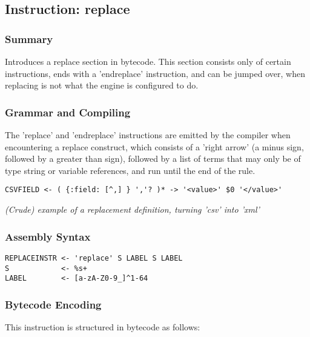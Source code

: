 \subsection{Instruction: replace}

\subsubsection{Summary}

Introduces a replace section in bytecode. This section consists only
of certain instructions, ends with a 'endreplace' instruction, and
can be jumped over, when replacing is not what the engine is configured
to do.

\subsubsection{Grammar and Compiling}

The 'replace' and 'endreplace' instructions are emitted by the compiler
when encountering a replace construct, which consists of a 'right arrow'
(a minus sign, followed by a greater than sign), followed by a list of
terms that may only be of type string or variable references, and run
until the end of the rule.

\begin{myquote}
\begin{verbatim}
CSVFIELD <- ( {:field: [^,] } ','? )* -> '<value>' $0 '</value>'

\end{verbatim}
\end{myquote}
\textit{(Crude) example of a replacement definition, turning 'csv' into 'xml'}

\subsubsection{Assembly Syntax}

\begin{myquote}
\begin{verbatim}
REPLACEINSTR <- 'replace' S LABEL S LABEL
S            <- %s+
LABEL        <- [a-zA-Z0-9_]^1-64

\end{verbatim}
\end{myquote}
\subsubsection{Bytecode Encoding}

This instruction is structured in bytecode as follows:

